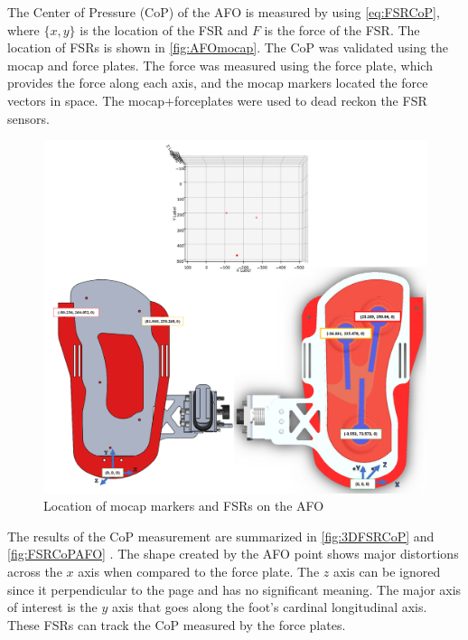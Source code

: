The Center of Pressure (CoP) of the AFO is measured by using \autoref{eq:FSRCoP}, where $\{x,y\}$ is the location of the FSR and $F$ is the force of the FSR. The location of FSRs is shown in \autoref{fig:AFOmocap}. The CoP was validated using the mocap and force plates. The force was measured using the force plate, which provides the force along each axis, and the mocap markers located the force vectors in space. The mocap+forceplates were used to dead reckon the FSR sensors. 




 \begin{figure}[h]
    \ContinuedFloat
           \captionsetup{justification=centering}
           \centerline{ \includegraphics[scale=0.22]{images/mech_design/Mocap_Layout_2.png}}
            \caption[AFO Mocap Markers]{Location of mocap markers and FSRs on the AFO \cite{Michaels2020}}
            \label{fig:AFOmocap}
    \end{figure}


The results of the CoP measurement are summarized in \autoref{fig:3DFSRCoP} and \autoref{fig:FSRCoPAFO} . The shape created by the AFO point shows major distortions across the $x$ axis when compared to the force plate. The $z$ axis can be ignored since it perpendicular to the page and has no significant meaning. The major axis of interest is the $y$ axis that goes along the foot's cardinal longitudinal axis. These FSRs can track the CoP measured by the force plates. 


